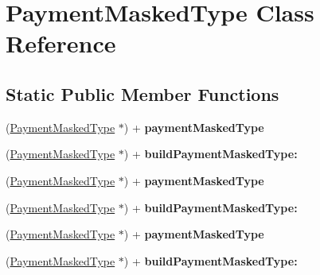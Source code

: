 \hypertarget{interface_payment_masked_type}{
\section{PaymentMaskedType Class Reference}
\label{interface_payment_masked_type}
}
\subsection*{Static Public Member Functions}
\begin{DoxyCompactItemize}
\item 
\hypertarget{interface_payment_masked_type_a506169494b68d8a7159a5fd00a72fb7b}{
(\hyperlink{interface_payment_masked_type}{PaymentMaskedType} $\ast$) + {\bfseries paymentMaskedType}}
\label{interface_payment_masked_type_a506169494b68d8a7159a5fd00a72fb7b}

\item 
\hypertarget{interface_payment_masked_type_a89b9f2ddfdecd9e2b30c2a6e0beb585b}{
(\hyperlink{interface_payment_masked_type}{PaymentMaskedType} $\ast$) + {\bfseries buildPaymentMaskedType:}}
\label{interface_payment_masked_type_a89b9f2ddfdecd9e2b30c2a6e0beb585b}

\item 
\hypertarget{interface_payment_masked_type_a506169494b68d8a7159a5fd00a72fb7b}{
(\hyperlink{interface_payment_masked_type}{PaymentMaskedType} $\ast$) + {\bfseries paymentMaskedType}}
\label{interface_payment_masked_type_a506169494b68d8a7159a5fd00a72fb7b}

\item 
\hypertarget{interface_payment_masked_type_a89b9f2ddfdecd9e2b30c2a6e0beb585b}{
(\hyperlink{interface_payment_masked_type}{PaymentMaskedType} $\ast$) + {\bfseries buildPaymentMaskedType:}}
\label{interface_payment_masked_type_a89b9f2ddfdecd9e2b30c2a6e0beb585b}

\item 
\hypertarget{interface_payment_masked_type_a506169494b68d8a7159a5fd00a72fb7b}{
(\hyperlink{interface_payment_masked_type}{PaymentMaskedType} $\ast$) + {\bfseries paymentMaskedType}}
\label{interface_payment_masked_type_a506169494b68d8a7159a5fd00a72fb7b}

\item 
\hypertarget{interface_payment_masked_type_a89b9f2ddfdecd9e2b30c2a6e0beb585b}{
(\hyperlink{interface_payment_masked_type}{PaymentMaskedType} $\ast$) + {\bfseries buildPaymentMaskedType:}}
\label{interface_payment_masked_type_a89b9f2ddfdecd9e2b30c2a6e0beb585b}

\end{DoxyCompactItemize}
